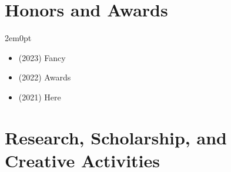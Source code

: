 \documentclass[11pt]{article}
\begin{document}
\section{Honors and Awards}
\begin{adjustwidth}{2em}{0pt}

\begin{itemize}
    \item (2023) Fancy
    \item (2022) Awards
    \item (2021) Here
\end{itemize}

\end{adjustwidth}

\section{Research, Scholarship, and Creative Activities}
\end{document}
